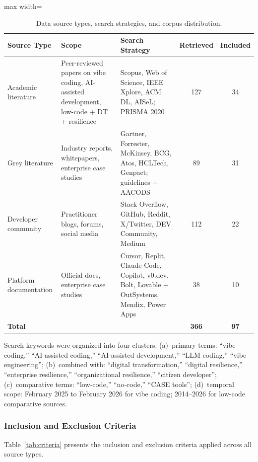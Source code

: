 \documentclass[preprint,12pt,authoryear]{elsarticle}
\begin{document}
\begin{table}[htbp]
\centering
\caption{Data source types, search strategies, and corpus distribution.}
\label{tab:corpus}
\small
\begin{adjustbox}{max width=\textwidth}
\begin{tabular}{@{}p{3cm}p{4.5cm}p{4.5cm}cc@{}}
\toprule
\textbf{Source Type} & \textbf{Scope} & \textbf{Search Strategy} & \textbf{Retrieved} & \textbf{Included} \\
\midrule
Academic literature & Peer-reviewed papers on vibe coding, AI-assisted development, low-code + DT + resilience & Scopus, Web of Science, IEEE Xplore, ACM DL, AISeL; PRISMA 2020 & 127 & 34 \\
\addlinespace
Grey literature & Industry reports, whitepapers, enterprise case studies & Gartner, Forrester, McKinsey, BCG, Atos, HCLTech, Genpact; \citet{Garousi2019} guidelines + AACODS & 89 & 31 \\
\addlinespace
Developer community & Practitioner blogs, forums, social media & Stack Overflow, GitHub, Reddit, X/Twitter, DEV Community, Medium & 112 & 22 \\
\addlinespace
Platform documentation & Official docs, enterprise case studies & Cursor, Replit, Claude Code, Copilot, v0.dev, Bolt, Lovable + OutSystems, Mendix, Power Apps & 38 & 10 \\
\midrule
\textbf{Total} & & & \textbf{366} & \textbf{97} \\
\bottomrule
\end{tabular}
\end{adjustbox}
\end{table}

Search keywords were organized into four clusters: (a)~primary terms: ``vibe coding,'' ``AI-assisted coding,'' ``AI-assisted development,'' ``LLM coding,'' ``vibe engineering''; (b)~combined with: ``digital transformation,'' ``digital resilience,'' ``enterprise resilience,'' ``organizational resilience,'' ``citizen developer''; (c)~comparative terms: ``low-code,'' ``no-code,'' ``CASE tools''; (d)~temporal scope: February 2025 to February 2026 for vibe coding; 2014--2026 for low-code comparative sources.

\subsubsection{Inclusion and Exclusion Criteria}

Table~\ref{tab:criteria} presents the inclusion and exclusion criteria applied across all source types.
\end{document}
